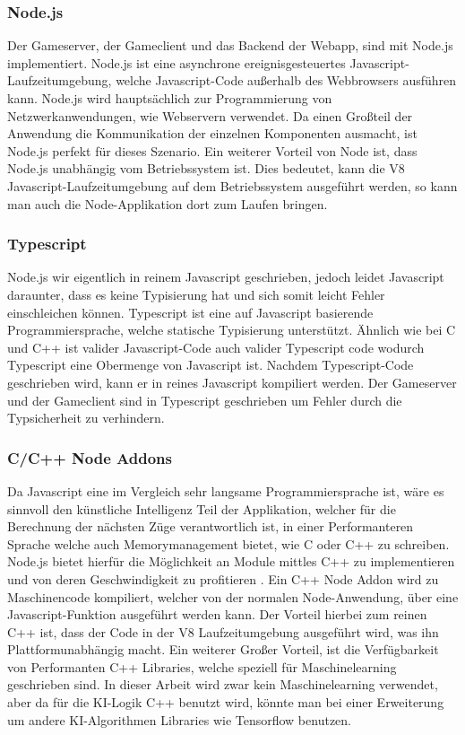 \documentclass[12pt,a4paper,bibliography=totocnumbered,listof=totocnumbered]{article}
\begin{document}
\subsubsection{Node.js}
Der Gameserver, der Gameclient und das Backend der Webapp, sind mit Node.js implementiert. 
Node.js ist eine asynchrone ereignisgesteuertes Javascript-Laufzeitumgebung, welche Javascript-Code außerhalb des Webbrowsers ausführen kann.
Node.js wird hauptsächlich zur Programmierung von Netzwerkanwendungen, wie Webservern verwendet. Da einen Großteil der Anwendung die
Kommunikation der einzelnen Komponenten ausmacht, ist Node.js perfekt für dieses Szenario. 
Ein weiterer Vorteil von Node ist, dass Node.js unabhängig vom Betriebssystem ist. Dies bedeutet, kann die V8 Javascript-Laufzeitumgebung
auf dem Betriebssystem ausgeführt werden, so kann man auch die Node-Applikation dort zum Laufen bringen.
\cite{Node}

\subsubsection{Typescript}
Node.js wir eigentlich in reinem Javascript geschrieben, jedoch leidet Javascript daraunter, dass es keine Typisierung hat und sich somit leicht Fehler 
einschleichen können. Typescript ist eine auf Javascript basierende Programmiersprache, welche statische Typisierung unterstützt. 
Ähnlich wie bei C und C++ ist valider Javascript-Code auch valider Typescript code wodurch Typescript eine Obermenge von Javascript ist.
Nachdem Typescript-Code geschrieben wird, kann er in reines Javascript kompiliert werden.
Der Gameserver und der Gameclient sind in Typescript geschrieben um Fehler durch die Typsicherheit zu verhindern. 

\subsubsection{C/C++ Node Addons}
Da Javascript eine im Vergleich sehr langsame Programmiersprache ist, wäre es sinnvoll den künstliche Intelligenz Teil der Applikation, welcher für die 
Berechnung der nächsten Züge verantwortlich ist, in einer Performanteren Sprache welche auch Memorymanagement bietet, wie C oder C++ zu schreiben. 
Node.js bietet hierfür die Möglichkeit an
Module mittles C++ zu implementieren und von deren Geschwindigkeit zu profitieren \cite{NodeC++Performance}. Ein C++ Node Addon wird zu Maschinencode kompiliert, welcher von der
normalen Node-Anwendung, über eine Javascript-Funktion ausgeführt werden kann. Der Vorteil hierbei zum reinen C++ ist, dass der Code in der V8 
Laufzeitumgebung ausgeführt wird, was ihn Plattformunabhängig macht. \cite{C++Node}
Ein weiterer Großer Vorteil, ist die Verfügbarkeit von Performanten C++ Libraries, welche speziell für Maschinelearning geschrieben sind. 
In dieser Arbeit wird zwar kein Maschinelearning verwendet, aber da für die KI-Logik C++ benutzt wird, könnte man bei einer Erweiterung 
um andere KI-Algorithmen Libraries wie Tensorflow benutzen.
\end{document}

